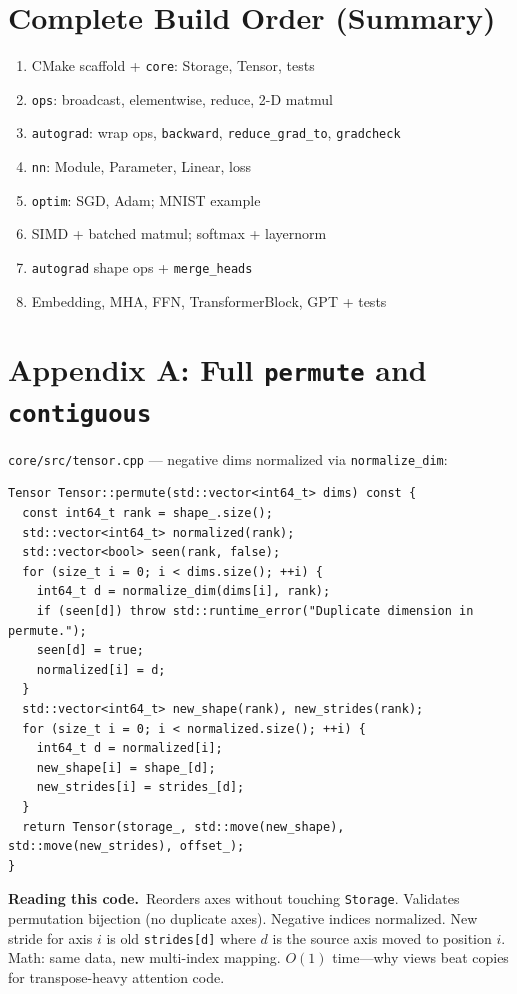 \documentclass[11pt,a4paper]{article}
\newcommand{\explain}{\par\smallskip\noindent}
\newcommand{\exhead}{\textbf{Reading this code.}\ }
\begin{document}
\section{Complete Build Order (Summary)}
\label{sec:summary}

\begin{enumerate}[leftmargin=*]
  \item CMake scaffold + \texttt{core}: Storage, Tensor, tests
  \item \texttt{ops}: broadcast, elementwise, reduce, 2-D matmul
  \item \texttt{autograd}: wrap ops, \texttt{backward}, \texttt{reduce\_grad\_to}, \texttt{gradcheck}
  \item \texttt{nn}: Module, Parameter, Linear, loss
  \item \texttt{optim}: SGD, Adam; MNIST example
  \item SIMD + batched matmul; softmax + layernorm
  \item \texttt{autograd} shape ops + \texttt{merge\_heads}
  \item Embedding, MHA, FFN, TransformerBlock, GPT + tests
\end{enumerate}

\appendix
\section{Appendix A: Full \texttt{permute} and \texttt{contiguous}}
\label{app:permute}

\texttt{core/src/tensor.cpp} --- negative dims normalized via \texttt{normalize\_dim}:

\begin{lstlisting}[style=cpp]
Tensor Tensor::permute(std::vector<int64_t> dims) const {
  const int64_t rank = shape_.size();
  std::vector<int64_t> normalized(rank);
  std::vector<bool> seen(rank, false);
  for (size_t i = 0; i < dims.size(); ++i) {
    int64_t d = normalize_dim(dims[i], rank);
    if (seen[d]) throw std::runtime_error("Duplicate dimension in permute.");
    seen[d] = true;
    normalized[i] = d;
  }
  std::vector<int64_t> new_shape(rank), new_strides(rank);
  for (size_t i = 0; i < normalized.size(); ++i) {
    int64_t d = normalized[i];
    new_shape[i] = shape_[d];
    new_strides[i] = strides_[d];
  }
  return Tensor(storage_, std::move(new_shape), std::move(new_strides), offset_);
}
\end{lstlisting}
\explain\exhead Reorders axes without touching \texttt{Storage}. Validates permutation bijection
(no duplicate axes). Negative indices normalized. New stride for axis $i$ is old \texttt{strides[d]}
where $d$ is the source axis moved to position $i$. Math: same data, new multi-index mapping.
$O(1)$ time---why views beat copies for transpose-heavy attention code.
\end{document}
